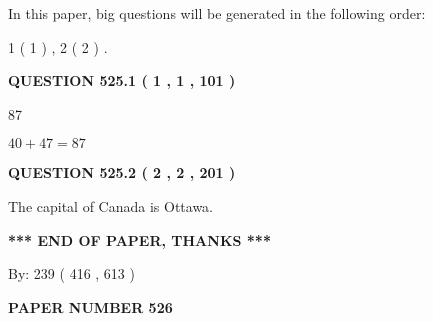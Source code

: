 \documentclass[12pt]{article}
\begin{document}
In this paper, big questions will be generated in the following order: 
   
   
   1 ( 1 )
 ,
   2 ( 2 )
 .
  
\vspace{0.2in}
  
{\textbf{\Large{QUESTION
525.1 
 ( 1 , 1 , 101 )
}}}
  
  
 
 
\noindent{}

87
 
 
 
 
\noindent{}

$ %
40 +  %
47=   %
87$
 
 
  
\vspace{0.2in}
  
{\textbf{\Large{QUESTION
525.2 
 ( 2 , 2 , 201 )
}}}
  
  
 
 
\noindent{}
 
 
The capital of Canada is Ottawa.
 
 
 
 
   
   
 \vspace{0.2in}
 
   
   
   
   
\vspace{1.0in} 
{\textbf{\large{ *** END OF PAPER, THANKS *** }}} 
   
   
\hspace{1.0in} By: 
 239 ( 416 ,  613 )
   
   
   
   
\newpage 
\setcounter{page}{ 
   526001 } 
   
   
   
   
 {\textbf{ \Large{ PAPER NUMBER  526  }}}
   
   
\vspace{0.2in}
   
   
   
   
   
\end{document}
